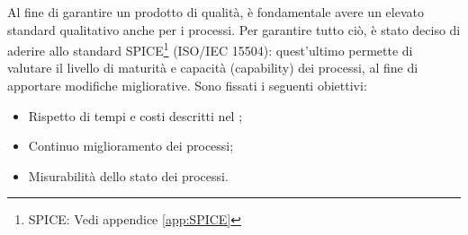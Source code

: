 Al fine di garantire un prodotto di qualità, è fondamentale avere un elevato standard qualitativo anche per i processi. Per garantire tutto ciò, è stato deciso di aderire allo standard {SPICE}\footnote{SPICE: Vedi appendice \cref{app:SPICE}} (ISO/IEC 15504): quest'ultimo permette di valutare il livello di {maturità} e capacità ({capability}) dei processi, al fine di apportare modifiche migliorative.\newline
Sono fissati i seguenti obiettivi:
\begin{itemize}
	\item Rispetto di tempi e costi descritti nel \PdP ;
	\item Continuo miglioramento dei processi;
	\item Misurabilità dello stato dei processi.
\end{itemize}
